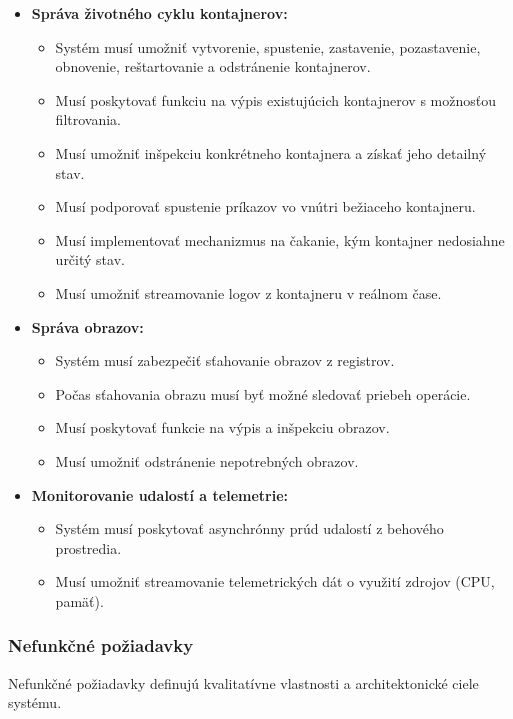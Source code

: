 \documentclass[
 program=infpvs,
  language=slovak,
  figures=false,
  tables=false,
  sourcecodes,
  glossaries,
  index
]{kidiplom}
\begin{document}
{\begin{itemize}
    \item \textbf{Správa životného cyklu kontajnerov:}
    \begin{itemize}
        \item Systém musí umožniť vytvorenie, spustenie, zastavenie, pozastavenie, obnovenie, reštartovanie a odstránenie kontajnerov.
        \item Musí poskytovať funkciu na výpis existujúcich kontajnerov s možnosťou filtrovania.
        \item Musí umožniť inšpekciu konkrétneho kontajnera a získať jeho detailný stav.
        \item Musí podporovať spustenie príkazov vo vnútri bežiaceho kontajneru.
        \item Musí implementovať mechanizmus na čakanie, kým kontajner nedosiahne určitý stav.
        \item Musí umožniť streamovanie logov z kontajneru v reálnom čase.
    \end{itemize}

    \item \textbf{Správa obrazov:}
    \begin{itemize}
        \item Systém musí zabezpečiť sťahovanie obrazov z registrov.
        \item Počas sťahovania obrazu musí byť možné sledovať priebeh operácie.
        \item Musí poskytovať funkcie na výpis a inšpekciu obrazov.
        \item Musí umožniť odstránenie nepotrebných obrazov.
    \end{itemize}
    
    \item \textbf{Monitorovanie udalostí a telemetrie:}
    \begin{itemize}
        \item Systém musí poskytovať asynchrónny prúd udalostí z behového prostredia.
        \item Musí umožniť streamovanie telemetrických dát o využití zdrojov (CPU, pamäť).
    \end{itemize}
\end{itemize}



\subsubsection{Nefunkčné požiadavky}  \label{sec:nefunkcne-poziadavky}
Nefunkčné požiadavky definujú kvalitatívne vlastnosti a architektonické ciele systému.

}
\end{document}
